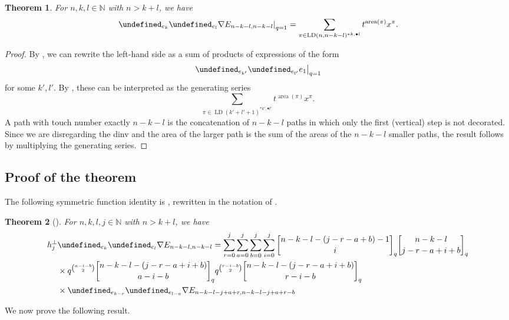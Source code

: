 \documentclass[reqno]{amsart}
\theoremstyle{plain}
\newtheorem{theorem}{Theorem}[section]
\theoremstyle{definition}
\theoremstyle{remark}
\DeclareMathOperator{\LD}{LD}
\DeclareMathOperator{\area}{area}
\let\oldTheta\Theta
\let\Theta\undefined
\DeclareMathOperator{\Theta}{\oldTheta}
\newcommand{\qbinom}[3][q]{\genfrac{[}{]}{0pt}{}{#2}{#3}_{#1}}
\newcommand{\<}{\langle}
\renewcommand{\>}{\rangle}
\begin{document}
\begin{theorem}
    \label{thm:theta_theta_Enn}
    For $n,k,l \in \mathbb{N}$ with $n > k+l$, we have
    \[ \left. \Theta_{e_k} \Theta_{e_l} \nabla E_{n-k-l, n-k-l} \right\rvert_{q=1} = \sum_{\pi \in \LD(n, n-k-l)^{\ast k, \bullet l}} t^{\area(\pi)} x^\pi. \]
\end{theorem}

\begin{proof}
    By , we can rewrite the left-hand side as a sum of products of expressions of the form
    \[ \left.\Theta_{e_{k'}} \Theta_{e_{l'}} e_1 \right\rvert_{q=1} \]
    for some $k', l'$. By , these can be interpreted as the generating series
    \[ \sum_{\pi \in \LD(k'+l'+1)^{\ast k', \bullet l'}} t^{\area(\pi)} x^\pi. \]
    A path with touch number exactly $n-k-l$ is the concatenation of $n-k-l$ paths in which only the first (vertical) step is not decorated. Since we are disregarding the dinv and the area of the larger path is the sum of the areas of the $n-k-l$ smaller paths, the result follows by multiplying the generating series.
\end{proof}

\subsection{Proof of the theorem}

The following symmetric function identity is \cite[Theorem~8.2]{DAdderioRomero2023ThetaIdentities}, rewritten in the notation of \cite{IraciNadeauVandenWyngaerd2024Smirnov}.

\begin{theorem}[{\cite[Theorem~8.2]{DAdderioRomero2023ThetaIdentities}}]
    \label{thm:full_recursion}
    For $n,k,l,j \in \mathbb{N}$ with $n > k+l$, we have
    \begin{align*}
        h_j^\perp & \Theta_{e_k} \Theta_{e_l} \nabla E_{n-k-l, n-k-l} = \sum_{r=0}^{j} \sum_{a=0}^{j} \sum_{b=0}^{j} \sum_{i=0}^{j} \qbinom{n-k-l-(j-r-a+b)-1}{i} \qbinom{n-k-l}{j-r-a+i+b} \\
        & \times q^{\binom{a-i-b}{2}} \qbinom{n-k-l-(j-r-a+i+b)}{a-i-b}  q^{\binom{r-i-b}{2}} \qbinom{n-k-l-(j-r-a+i+b)}{r-i-b} \\
        & \times \Theta_{e_{k-r}} \Theta_{e_{l-a}} \nabla E_{n-k-l-j+a+r,n-k-l-j+a+r-b}
    \end{align*}
\end{theorem}

We now prove the following result.
\end{document}
